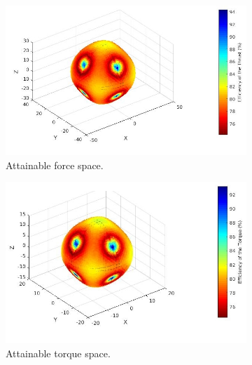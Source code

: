 \begin{figure}[!ht]
  \begin{center}
  \begin{subfigure}[b]{0.42\textwidth}
    \centering
    \includegraphics[width=\linewidth]{images/Quad_design_2_fspace.jpg}
    \caption{Attainable force space.} \label{fig:deisgn1_fspace}
  \end{subfigure}
  \hspace*{\fill} %
  \begin{subfigure}[b]{0.4\textwidth}
    \centering
    \includegraphics[width=\linewidth]{images/Quad_design_2_tspace.jpg}
    \caption{Attainable torque space.} \label{fig:deisgn1_tspace}
  \end{subfigure}
  \begin{subfigure}[b]{0.45\textwidth}
    \centering

\end{subfigure}
\end{center}
\end{figure}
